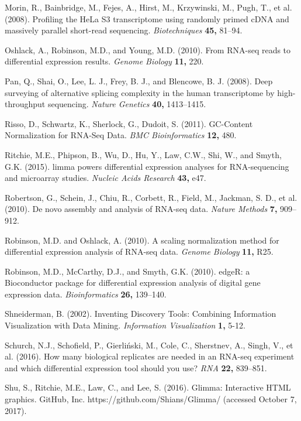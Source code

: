 \documentclass[useAMS,referee]{biom}
\begin{document}
\begin{thebibliography}{}
\bibitem{ } Morin, R., Bainbridge, M., Fejes, A., Hirst, M., Krzywinski, M., Pugh, T., et al. (2008). Profiling the HeLa S3 transcriptome using randomly primed cDNA and massively parallel short-read sequencing. \textit{Biotechniques} \textbf{45,} 81–94.

\bibitem{ } Oshlack, A., Robinson, M.D., and Young, M.D. (2010). From RNA-seq reads to differential expression results. \textit{Genome Biology} \textbf{11,} 220.

\bibitem{ } Pan, Q., Shai, O., Lee, L. J., Frey, B. J., and Blencowe, B. J. (2008). Deep surveying of alternative splicing complexity in the human transcriptome by high-throughput sequencing. \textit{Nature Genetics} \textbf{40,} 1413–1415.

\bibitem{ } Risso, D., Schwartz, K., Sherlock, G., Dudoit, S. (2011). GC-Content Normalization for RNA-Seq Data. \textit{BMC Bioinformatics} \textbf{12,} 480.

\bibitem{ } Ritchie, M.E., Phipson, B., Wu, D., Hu, Y., Law, C.W., Shi, W., and Smyth, G.K. (2015). limma powers differential expression analyses for RNA-sequencing and microarray studies. \textit{Nucleic Acids Research} \textbf{43,} e47.

\bibitem{ } Robertson, G., Schein, J., Chiu, R., Corbett, R., Field, M., Jackman, S. D., et al. (2010). De novo assembly and analysis of RNA-seq data. \textit{Nature Methods} \textbf{7,} 909–912.

\bibitem{ } Robinson, M.D. and Oshlack, A. (2010). A scaling normalization method for differential expression analysis of RNA-seq data. \textit{Genome Biology} \textbf{11,} R25.

\bibitem{ } Robinson, M.D., McCarthy, D.J., and Smyth, G.K. (2010). edgeR: a Bioconductor package for differential expression analysis of digital gene expression data. \textit{Bioinformatics} \textbf{26,} 139–140.

\bibitem{ } Shneiderman, B. (2002). Inventing Discovery Tools: Combining Information Visualization with Data Mining. \textit{Information Visualization} \textbf{1,} 5-12.

\bibitem{ } Schurch, N.J., Schofield, P., Gierliński, M., Cole, C., Sherstnev, A., Singh, V., et al. (2016). How many biological replicates are needed in an RNA-seq experiment and which differential expression tool should you use? \textit{RNA} \textbf{22,} 839–851.

\bibitem{ } Shu, S., Ritchie, M.E., Law, C., and Lee, S. (2016). Glimma: Interactive HTML graphics. GitHub, Inc. https://github.com/Shians/Glimma/ (accessed October 7, 2017).


\end{thebibliography}
\end{document}
